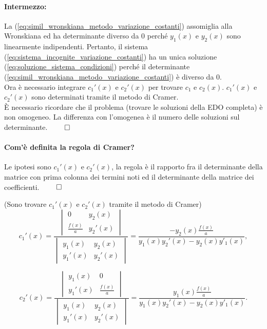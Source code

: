\paragraph{Intermezzo:} La (\ref{eq:simil_wronskiana_metodo_variazione_costanti}) assomiglia alla Wronskiana ed ha determinante diverso da 0 perché $y_1(x)$ e $y_2(x)$ sono linearmente indipendenti. Pertanto, il sistema (\ref{eq:sistema_incognite_variazione_costanti}) ha un unica soluzione (\ref{eq:soluzione_sistema_condizioni}) perché il determinante (\ref{eq:simil_wronskiana_metodo_variazione_costanti}) è diverso da 0.\\
Ora è necessario integrare $c_1'(x)$ e $c_2'(x)$ per trovare $c_1$ e $c_2(x)$. $c_1'(x)$ e $c_2'(x)$ sono determinati tramite il metodo di Cramer.\\
È necessario ricordare che il problema (trovare le soluzioni della EDO completa) è non omogeneo. La differenza con l'omogenea è il numero delle soluzioni sul determinante. $\qed$

\paragraph{Com'è definita la regola di Cramer?} Le ipotesi sono $c_1'(x)$ e $c_2'(x)$, la regola è il rapporto fra il determinante della matrice con prima colonna dei termini noti ed il determinante della matrice dei coefficienti. $\qed$

\noindent (Sono trovare $c_1'(x)$ e $c_2'(x)$ tramite il metodo di Cramer)
\begin{equation*}
	c_1'(x)=\frac{
	\begin{vmatrix}
		0 & y_2(x)\\
		\frac{f(x)}{a} & y_2'(x)
	\end{vmatrix}
	}{
	\begin{vmatrix}
		y_1(x) & y_2(x)\\
		y_1'(x) & y_2'(x)
	\end{vmatrix}
	} = \frac{-y_2(x)\frac{f(x)}{a}}{y_1(x)y_2'(x) - y_2(x) y'_1(x)},
\end{equation*}

\begin{equation*}
	c_2'(x)=\frac{
		\begin{vmatrix}
			y_1(x) & 0\\
			 y_1'(x) & \frac{f(x)}{a}
		\end{vmatrix}
	}{
		\begin{vmatrix}
			y_1(x) & y_2(x)\\
			y_1'(x) & y_2'(x)
		\end{vmatrix}
	} = \frac{y_1(x)\frac{f(x)}{a}}{y_1(x)y_2'(x) - y_2(x) y'_1(x)}.
\end{equation*}

